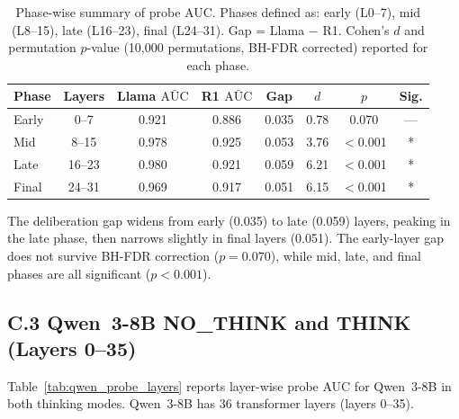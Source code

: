 \documentclass[accepted]{article}
\begin{document}
\begin{table}[ht]
\centering
\caption{Phase-wise summary of probe AUC.  Phases defined as: early
  (L0--7), mid (L8--15), late (L16--23), final (L24--31).  Gap =
  Llama $-$ R1.  Cohen's $d$ and permutation $p$-value (10{,}000
  permutations, BH-FDR corrected) reported for each phase.}
\label{tab:phase_summary}
\vspace{4pt}
\small
\begin{tabular}{lccccccc}
\toprule
\textbf{Phase} & \textbf{Layers} &
  \textbf{Llama $\bar{\mathrm{AUC}}$} & \textbf{R1 $\bar{\mathrm{AUC}}$} &
  \textbf{Gap} & \textbf{$d$} & \textbf{$p$} & \textbf{Sig.} \\
\midrule
Early & 0--7  & 0.921 & 0.886 & 0.035 & 0.78 & 0.070 & --- \\
Mid   & 8--15 & 0.978 & 0.925 & 0.053 & 3.76 & $<$0.001 & * \\
Late  & 16--23& 0.980 & 0.921 & 0.059 & 6.21 & $<$0.001 & * \\
Final & 24--31& 0.969 & 0.917 & 0.051 & 6.15 & $<$0.001 & * \\
\bottomrule
\end{tabular}
\end{table}

\noindent The deliberation gap widens from early (0.035) to late
(0.059) layers, peaking in the late phase, then narrows slightly in
final layers (0.051).  The early-layer gap does not survive BH-FDR
correction ($p = 0.070$), while mid, late, and final phases are all
significant ($p < 0.001$).

\subsection*{C.3 Qwen~3-8B NO\_THINK and THINK (Layers 0--35)}

Table~\ref{tab:qwen_probe_layers} reports layer-wise probe AUC for
Qwen~3-8B in both thinking modes.  Qwen~3-8B has 36 transformer
layers (layers 0--35).
\end{document}
